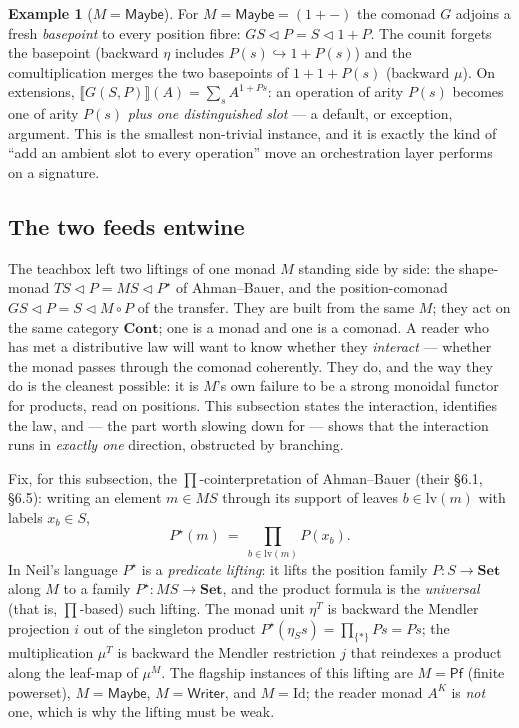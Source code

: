 \documentclass[11pt,a4paper]{book}
\newcommand{\Set}{\mathbf{Set}}
\newcommand{\Cont}{\mathbf{Cont}}
\newcommand{\cont}[2]{#1 \triangleleft #2}
\newcommand{\Ext}[1]{\llbracket #1 \rrbracket}
\theoremstyle{plain}
\theoremstyle{definition}
\newtheorem{Example}[Theorem]{Example}
\theoremstyle{remark}
\begin{document}
\begin{Example}[$M=\mathsf{Maybe}$]\label{ex:transfer-maybe}
For $M=\mathsf{Maybe}=(1+-)$ the comonad $G$ adjoins a fresh \emph{basepoint} to every position
fibre: $G\cont SP=\cont S{1+P}$. The counit forgets the basepoint (backward $\eta$ includes
$P(s)\hookrightarrow 1+P(s)$) and the comultiplication merges the two basepoints of $1+1+P(s)$
(backward $\mu$). On extensions, $\Ext{G(S,P)}(A)=\sum_{s}A^{1+P s}$: an operation of arity $P(s)$
becomes one of arity $P(s)$ \emph{plus one distinguished slot} --- a default, or exception,
argument. This is the smallest non-trivial instance, and it is exactly the kind of ``add an
ambient slot to every operation'' move an orchestration layer performs on a signature.
\end{Example}

\subsection{The two feeds entwine}
\label{sec:moncomon-entwine}

The teachbox left two liftings of one monad $M$ standing side by side: the shape-monad
$T\cont SP=\cont{MS}{P^{\star}}$ of Ahman--Bauer, and the position-comonad $G\cont SP=\cont S{M\circ P}$
of the transfer. They are built from the same $M$; they act on the same category $\Cont$; one is a
monad and one is a comonad. A reader who has met a distributive law will want to know whether they
\emph{interact} --- whether the monad passes through the comonad coherently. They do, and the way they
do is the cleanest possible: it is $M$'s own failure to be a strong monoidal functor for products,
read on positions. This subsection states the interaction, identifies the law, and --- the part worth
slowing down for --- shows that the interaction runs in \emph{exactly one} direction, obstructed by
branching.

Fix, for this subsection, the $\prod$-cointerpretation of Ahman--Bauer (their \S6.1, \S6.5): writing an
element $m\in MS$ through its support of leaves $b\in\mathrm{lv}(m)$ with labels $x_{b}\in S$,
\[
  P^{\star}(m)\ =\ \prod_{b\in\mathrm{lv}(m)}P(x_{b}).
\]
In Neil's language $P^{\star}$ is a \emph{predicate lifting}: it lifts the position family
$P\colon S\to\Set$ along $M$ to a family $P^{\star}\colon MS\to\Set$, and the product formula is the
\emph{universal} (that is, $\prod$-based) such lifting. The monad unit $\eta^{T}$ is backward the Mendler
projection $i$ out of the singleton product $P^{\star}(\eta_{S}s)=\prod_{\{*\}}Ps=Ps$; the multiplication
$\mu^{T}$ is backward the Mendler restriction $j$ that reindexes a product along the leaf-map of
$\mu^{M}$. The flagship instances of this lifting are $M=\mathsf{Pf}$ (finite powerset),
$M=\mathsf{Maybe}$, $M=\mathsf{Writer}$, and $M=\mathrm{Id}$; the reader monad $A^{K}$ is \emph{not} one,
which is why the lifting must be weak.
\end{document}
